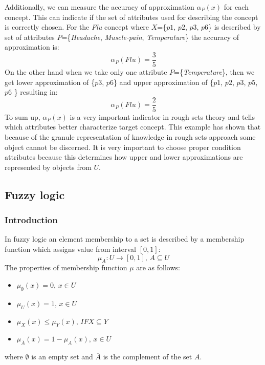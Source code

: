 Additionally, we can measure the accuracy of approximation $\alpha_P(x)$ for each concept.
This can indicate if the set of attributes used for describing the concept is correctly
chosen. For the \textit{Flu} concept where $X$=\{$p1$, $p2$, $p3$, $p6$\} is described by
set of attributes $P$=\{\textit{Headache}, \textit{Muscle-pain},
\textit{Temperature}\} the accuracy of approximation is:
$$\alpha_P(Flu) = \frac{3}{5}$$
On the other hand when we take only one attribute $P$=\{\textit{Temperature}\}, then we get lower approximation of 
\{$p3$, $p6$\} and upper approximation of \{$p1$, $p2$, $p3$, $p5$, $p6$ \}
resulting in:
$$\alpha_P(Flu) = \frac{2}{5}$$
To sum up, $\alpha_P(x)$ is a very important indicator in
rough sets theory and tells which attributes better characterize target
concept. This example has shown that because of the granule representation of
knowledge in rough sets approach some object cannot be discerned. It is very
important to choose proper condition attributes because this determines how
upper and lower approximations are represented by objects from $U$. 


\subsection{Fuzzy logic}
\label{cha:Fuzzy_logic}
\subsubsection{Introduction}
In fuzzy logic an element membership to a set is described by a membership function 
which assigns value from interval $[0, 1]$:
\begin{equation}
    \mu_A:U\rightarrow [0,1], \, A \subseteq U
    \label{eq:fuzzy_function}
\end{equation}
The properties of membership function $\mu$ are as follows:
\begin{itemize}
    \item $\mu_{\emptyset}(x) = 0, \, x \in U$
    \item  $\mu_{U}(x) = 1, \, x \in U$
    \item  $\mu_{X}(x) \leq \mu_{Y}(x), \, IF X \subseteq Y$
    \item  $\mu_{\overline{A}}(x) = 1 - \mu_{A}(x), \, x \in U$
\end{itemize}
where $\emptyset$ is an empty set and $\overline{A}$ is the complement of the
set $A$.

